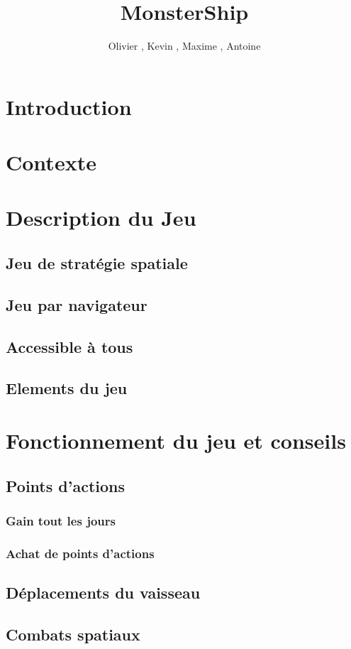\documentclass[a4paper,11pt]{report}
\title{MonsterShip}
\author{Olivier \bsc{Boissard}, Kevin \bsc{Boulala}, Maxime \bsc{Dubois}, Antoine \bsc{Lavier}}
\begin{document}
\maketitle
\setcounter{tocdepth}{1}
\tableofcontents

\chapter{Introduction}
\chapter{Contexte}
\chapter{Description du Jeu}
  \section{Jeu de stratégie spatiale}
  \section{Jeu par navigateur}
  \section{Accessible à tous}
  \section{Elements du jeu}
\chapter{Fonctionnement du jeu et conseils}
  \section{Points d'actions}
    \subsection{Gain tout les jours}
    \subsection{Achat de points d'actions}
  \section{Déplacements du vaisseau}
  \section{Combats spatiaux}
\end{document}
